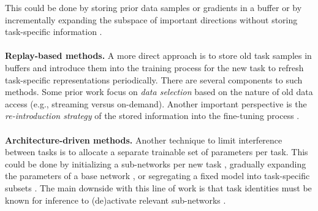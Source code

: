 This could be done by storing prior data samples or gradients in a buffer \citep{lopezpaz2017gradient, farajtabar2020orthogonal, chaudhry2018efficient} or by incrementally expanding the subspace of important directions without storing task-specific information \citep{zeng2019continual, wang2021training, wang2023orthogonal}.
\\
\\
\textbf{Replay-based methods.} A more direct approach is to store old task samples in buffers and introduce them into the training process for the new task to refresh task-specific representations periodically.
There are several components to such methods. Some prior work focus on \emph{data selection} based on the nature of old data access \citep{rebuffi2017icarl, aljundi2019gradient, Bang2021RainbowMC, chaudhry2019continual, isle2018selective, delange2021continual, borsos2020coresets, tiwari2021gcr} (e.g., streaming versus on-demand). Another important perspective is the \emph{re-introduction strategy} of the stored information into the fine-tuning process \citep{silver2002task, li2016learning, Triki2017EncoderBL, Lee2019OvercomingCF, dhar2019learning, rebuffi2017icarl, riemer2019learning, chaudhry2019continual, delange2021continual, tiwari2021gcr}.
\\
\\
\textbf{Architecture-driven methods.} Another technique to limit interference between tasks is to allocate a separate trainable set of parameters per task. 
This could be done by initializing a sub-networks per new task \citep{Rusu2016ProgressiveNN, aljundi2017expertgate, patrick2020routing, rajasegaran2019random, Ramesh2021ModelZA, wang2023incorporating, wang2022coscl}, gradually expanding the parameters of a base network \citep{yoon2018lifelong, Ostapenko2019LearningTR, hung2019compacting}, or segregating a fixed model into task-specific subsets \citep{mallya2018piggyback, kang2022forgetfree, serra2018overcoming, worstman2020supermasks, Mallya2017PackNetAM, gurbuz2022nispa, jung2020continual}. 
The main downside with this line of work is that task identities must be known for inference to (de)activate relevant sub-networks \citep{aljundi2017expertgate}. 

